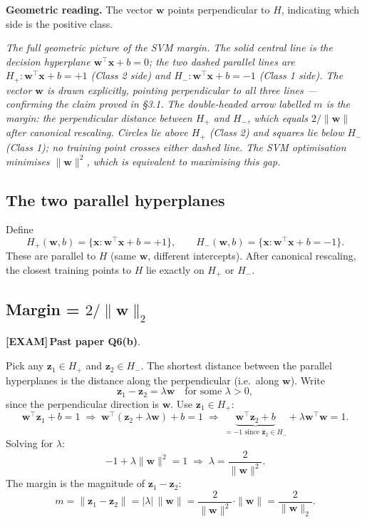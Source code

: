 \documentclass[11pt, a4paper]{article}
\newcommand{\examflag}{\textcolor{tipBd}{\textbf{[EXAM]}}\,}
\newcommand{\doflag}{\textcolor{defBd}{\textbf{[DO]}}\,}
\begin{document}
\textbf{Geometric reading.} The vector $\mathbf{w}$ points perpendicular to $H$, indicating which side is the positive class.

\begin{center}

\footnotesize\textit{The full geometric picture of the SVM margin. The solid central line is the decision hyperplane $\mathbf{w}^\top\mathbf{x} + b = 0$; the two dashed parallel lines are $H_+ : \mathbf{w}^\top\mathbf{x} + b = +1$ (Class 2 side) and $H_- : \mathbf{w}^\top\mathbf{x} + b = -1$ (Class 1 side). The vector $\mathbf{w}$ is drawn explicitly, pointing perpendicular to all three lines --- confirming the claim proved in \S3.1. The double-headed arrow labelled $m$ is the margin: the perpendicular distance between $H_+$ and $H_-$, which equals $2/\|\mathbf{w}\|$ after canonical rescaling. Circles lie above $H_+$ (Class 2) and squares lie below $H_-$ (Class 1); no training point crosses either dashed line. The SVM optimisation minimises $\|\mathbf{w}\|^2$, which is equivalent to maximising this gap.}
\end{center}

\subsection{The two parallel hyperplanes}

Define
\[
H_+(\mathbf{w}, b) = \{\mathbf{x} : \mathbf{w}^\top\mathbf{x} + b = +1\}, \qquad
H_-(\mathbf{w}, b) = \{\mathbf{x} : \mathbf{w}^\top\mathbf{x} + b = -1\}.
\]
These are parallel to $H$ (same $\mathbf{w}$, different intercepts). After canonical rescaling, the closest training points to $H$ lie exactly on $H_+$ or $H_-$.

\subsection{Margin = $2 / \|\mathbf{w}\|_2$}

\examflag{}\textbf{Past paper Q6(b)}.

\begin{exbox}[\doflag{}Distance between $H_+$ and $H_-$]
Pick any $\mathbf{z}_1 \in H_+$ and $\mathbf{z}_2 \in H_-$. The shortest distance between the parallel hyperplanes is the distance along the perpendicular (i.e.\ along $\mathbf{w}$). Write
\[
\mathbf{z}_1 - \mathbf{z}_2 = \lambda \mathbf{w} \quad \text{for some } \lambda > 0,
\]
since the perpendicular direction is $\mathbf{w}$. Use $\mathbf{z}_1 \in H_+$:
\[
\mathbf{w}^\top\mathbf{z}_1 + b = 1
\;\Longrightarrow\;
\mathbf{w}^\top(\mathbf{z}_2 + \lambda\mathbf{w}) + b = 1
\;\Longrightarrow\;
\underbrace{\mathbf{w}^\top\mathbf{z}_2 + b}_{=-1\text{ since }\mathbf{z}_2\in H_-} + \lambda\mathbf{w}^\top\mathbf{w} = 1.
\]
Solving for $\lambda$:
\[
-1 + \lambda\|\mathbf{w}\|^2 = 1 \;\Longrightarrow\; \lambda = \frac{2}{\|\mathbf{w}\|^2}.
\]
The margin is the magnitude of $\mathbf{z}_1 - \mathbf{z}_2$:
\[
\boxed{\;m = \|\mathbf{z}_1 - \mathbf{z}_2\| = |\lambda|\,\|\mathbf{w}\| = \frac{2}{\|\mathbf{w}\|^2}\cdot\|\mathbf{w}\| = \frac{2}{\|\mathbf{w}\|_2}.\;}
\]
\end{exbox}
\end{document}
